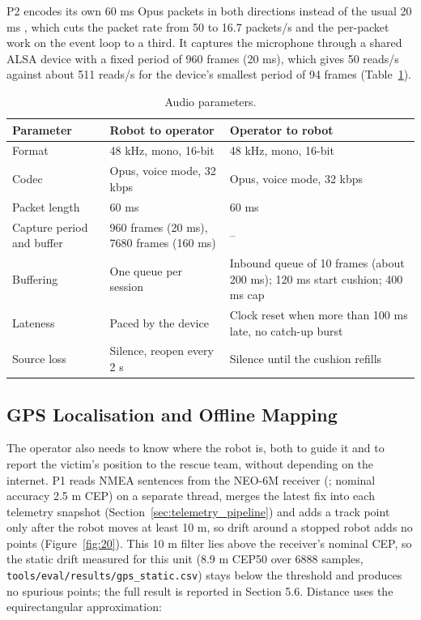 P2 encodes its own 60 ms Opus packets in both directions instead of the usual 20 ms \cite{valin2012}, which cuts the packet rate from 50 to 16.7 packets/s and the per-packet work on the event loop to a third. It captures the microphone through a shared ALSA device with a fixed period of 960 frames (20 ms), which gives 50 reads/s against about 511 reads/s for the device's smallest period of 94 frames (Table~\ref{tab:14}).

\begin{table}[!t]
\centering
\caption{Audio parameters.}
\label{tab:14}
\begin{tabularx}{\linewidth}{p{3.3cm} X X}
\toprule
Parameter & Robot to operator & Operator to robot \\
\midrule
Format & 48 kHz, mono, 16-bit & 48 kHz, mono, 16-bit \\
Codec & Opus, voice mode, 32 kbps & Opus, voice mode, 32 kbps \\
Packet length & 60 ms & 60 ms \\
Capture period and buffer & 960 frames (20 ms), 7680 frames (160 ms) & -- \\
Buffering & One queue per session & Inbound queue of 10 frames (about 200 ms); 120 ms start cushion; 400 ms cap \\
Lateness & Paced by the device & Clock reset when more than 100 ms late, no catch-up burst \\
Source loss & Silence, reopen every 2 s & Silence until the cushion refills \\
\bottomrule
\end{tabularx}
\end{table}

\subsection{GPS Localisation and Offline Mapping}
\label{sec:gps}

The operator also needs to know where the robot is, both to guide it and to report the victim's position to the rescue team, without depending on the internet. P1 reads NMEA sentences from the NEO-6M receiver (\cite{ublox_neo6}; nominal accuracy 2.5 m CEP) on a separate thread, merges the latest fix into each telemetry snapshot (Section~\ref{sec:telemetry_pipeline}) and adds a track point only after the robot moves at least 10 m, so drift around a stopped robot adds no points (Figure~\ref{fig:20}). This 10 m filter lies above the receiver's nominal CEP, so the static drift measured for this unit (8.9 m CEP50 over 6888 samples, \texttt{tools/eval/results/gps\_static.csv}) stays below the threshold and produces no spurious points; the full result is reported in Section 5.6. Distance uses the equirectangular approximation:

